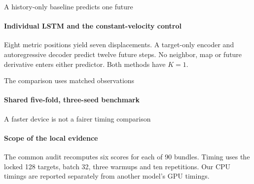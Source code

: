 \begin{frame}{A history-only baseline predicts one future}
\framesubtitle{Individual LSTM and the constant-velocity control}
Eight metric positions yield seven displacements. A target-only encoder and
autoregressive decoder predict twelve future steps. No neighbor, map or future
derivative enters either predictor. Both methods have $K=1$.
\end{frame}

\begin{frame}{The comparison uses matched observations}
\framesubtitle{Shared five-fold, three-seed benchmark}

\end{frame}

\begin{frame}{A faster device is not a fairer timing comparison}
\framesubtitle{Scope of the local evidence}
The common audit recomputes six scores for each of 90 bundles. Timing uses the
locked 128 targets, batch 32, three warmups and ten repetitions. Our CPU timings
are reported separately from another model's GPU timings.
\end{frame}
